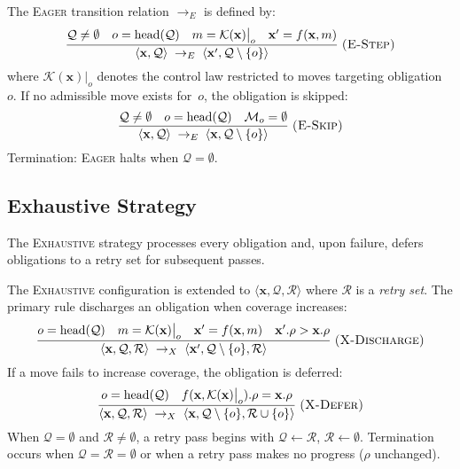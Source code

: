 \documentclass[11pt]{article}
\newcommand{\CL}{\mathcal{K}}              %
\newcommand{\xstate}{\mathbf{x}}           %
\newcommand{\vcov}{\rho}                   %
\newcommand{\moves}{\mathcal{M}}           %
\begin{document}
\begin{definition}
  \label{def:eager}
  The \textsc{Eager} transition relation $\to_E$ is defined by:
  \[
    \frac{
      \mathcal{Q} \neq \emptyset \quad
      o = \mathrm{head}(\mathcal{Q}) \quad
      m = \CL(\xstate)\big|_o \quad
      \xstate' = f(\xstate, m)
    }{
      \langle \xstate, \mathcal{Q} \rangle
        \;\to_E\;
      \langle \xstate', \mathcal{Q} \setminus \{o\} \rangle
    }
    \;\textsc{(E-Step)}
  \]
  where $\CL(\xstate)\big|_o$ denotes the control law restricted to
  moves targeting obligation~$o$.  If no admissible move exists
  for~$o$, the obligation is skipped:
  \[
    \frac{
      \mathcal{Q} \neq \emptyset \quad
      o = \mathrm{head}(\mathcal{Q}) \quad
      \moves_o = \emptyset
    }{
      \langle \xstate, \mathcal{Q} \rangle
        \;\to_E\;
      \langle \xstate, \mathcal{Q} \setminus \{o\} \rangle
    }
    \;\textsc{(E-Skip)}
  \]
  Termination: \textsc{Eager} halts when $\mathcal{Q} = \emptyset$.
\end{definition}

\subsection{Exhaustive Strategy}

The \textsc{Exhaustive} strategy processes every obligation and, upon
failure, defers obligations to a retry set for subsequent passes.

\begin{definition}
  \label{def:exhaustive}
  The \textsc{Exhaustive} configuration is extended to
  $\langle \xstate, \mathcal{Q}, \mathcal{R} \rangle$ where
  $\mathcal{R}$ is a \emph{retry set}.  The primary rule discharges
  an obligation when coverage increases:
  \[
    \frac{
      o = \mathrm{head}(\mathcal{Q}) \quad
      m = \CL(\xstate)\big|_o \quad
      \xstate' = f(\xstate, m) \quad
      \xstate'.\vcov > \xstate.\vcov
    }{
      \langle \xstate, \mathcal{Q}, \mathcal{R} \rangle
        \;\to_X\;
      \langle \xstate', \mathcal{Q} \setminus \{o\}, \mathcal{R} \rangle
    }
    \;\textsc{(X-Discharge)}
  \]
  If a move fails to increase coverage, the obligation is deferred:
  \[
    \frac{
      o = \mathrm{head}(\mathcal{Q}) \quad
      f(\xstate, \CL(\xstate)\big|_o).\vcov = \xstate.\vcov
    }{
      \langle \xstate, \mathcal{Q}, \mathcal{R} \rangle
        \;\to_X\;
      \langle \xstate, \mathcal{Q} \setminus \{o\},
              \mathcal{R} \cup \{o\} \rangle
    }
    \;\textsc{(X-Defer)}
  \]
  When $\mathcal{Q} = \emptyset$ and $\mathcal{R} \neq \emptyset$, a
  retry pass begins with $\mathcal{Q} \leftarrow \mathcal{R}$,
  $\mathcal{R} \leftarrow \emptyset$.  Termination occurs when
  $\mathcal{Q} = \mathcal{R} = \emptyset$ or when a retry pass makes
  no progress ($\vcov$ unchanged).
\end{definition}
\end{document}
